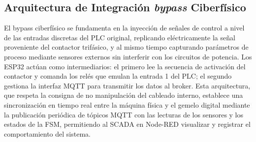 \subsection*{Arquitectura de Integración \textit{bypass} Ciberfísico}
El bypass ciberfísico se fundamenta en la inyección de señales de control a nivel de las entradas discretas del PLC original, replicando eléctricamente la señal proveniente del contactor trifásico, y al mismo tiempo capturando parámetros de proceso mediante sensores externos sin interferir con los circuitos de potencia. Los ESP32 actúan como intermediarios: el primero lee la secuencia de activación del contactor y comanda los relés que emulan la entrada 1 del PLC; el segundo gestiona la interfaz MQTT para transmitir los datos al broker. Esta arquitectura, que respeta la consigna de no manipulación del cableado interno, establece una sincronización en tiempo real entre la máquina física y el gemelo digital mediante la publicación periódica de tópicos MQTT con las lecturas de los sensores y los estados de la FSM, permitiendo al SCADA en Node-RED visualizar y registrar el comportamiento del sistema.


